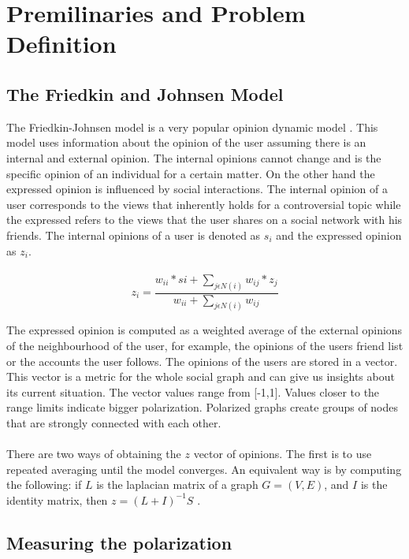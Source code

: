 \chapter{Premilinaries and Problem Definition}
\label{ch:premAndDef}


\section{The Friedkin and Johnsen Model}
\label{sec:prem}

The Friedkin-Johnsen model is a very popular opinion dynamic model \cite{friedkin}. This model uses information about the opinion of the user assuming there is an internal and external opinion. The internal opinions cannot change and is the specific opinion of an individual for a certain matter. On the other hand the expressed opinion is influenced by social interactions. The internal opinion of a user corresponds to the views that inherently holds for a controversial topic while the expressed refers to the views that the user shares on a social network with his friends.
The internal opinions of a user is denoted as $s_i$ and the expressed opinion as $z_i$.  
\\
\\
\begin{equation} 
	z_i = \frac{w_{ii}*si + \sum_{j \epsilon N(i) }{w_{ij}*z_j}} {w_{ii} + \sum_{j \epsilon N(i) }{w_{ij}}} 
\end{equation} 
\clearpage

\noindent The expressed opinion is computed as a weighted average of the external opinions of the neighbourhood of the user, for example, the opinions of the users friend list or the accounts the user follows. The opinions of the users are stored in a vector. This vector is a metric for the whole social graph and can give us insights about its current situation. The vector values range from [-1,1]. Values closer to the range limits indicate bigger polarization. Polarized graphs create groups of nodes that are strongly connected with each other.
\\
\\
There are two ways of obtaining the $z$ vector of opinions. The first is to use repeated averaging until the model converges. An equivalent way is by computing the following: if $L$ is the laplacian matrix of a graph $G=(V,E)$, and $I$ is the identity matrix, then $z=(L+I)^{-1}S$ \cite{bindel}. 

\section{Measuring the polarization}
\label{sec:meas}

